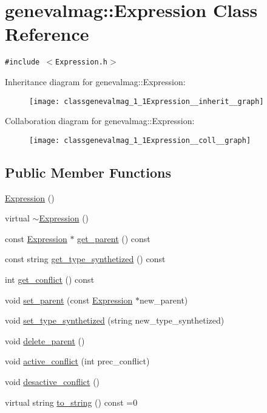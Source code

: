 \hypertarget{classgenevalmag_1_1Expression}{
\section{genevalmag::Expression Class Reference}
\label{classgenevalmag_1_1Expression}
}
{\tt \#include $<$Expression.h$>$}

Inheritance diagram for genevalmag::Expression:\nopagebreak
\begin{figure}[H]
\begin{center}
\leavevmode
\texttt{[image: classgenevalmag\_1\_1Expression\_\_inherit\_\_graph]}
\end{center}
\end{figure}
Collaboration diagram for genevalmag::Expression:\nopagebreak
\begin{figure}[H]
\begin{center}
\leavevmode
\texttt{[image: classgenevalmag\_1\_1Expression\_\_coll\_\_graph]}
\end{center}
\end{figure}
\subsection*{Public Member Functions}
\begin{CompactItemize}
\item 
\hyperlink{classgenevalmag_1_1Expression_249f080918dd3203c7dfc8e9e691bc50}{Expression} ()
\item 
virtual \hyperlink{classgenevalmag_1_1Expression_9ab15992e6a819e8e683745069bcf15b}{$\sim$Expression} ()
\item 
const \hyperlink{classgenevalmag_1_1Expression}{Expression} $\ast$ \hyperlink{classgenevalmag_1_1Expression_21b78e4077b2c9d41076f8c798996f34}{get\_\-parent} () const 
\item 
const string \hyperlink{classgenevalmag_1_1Expression_70ea402fd43f8c588c83196bc4a10183}{get\_\-type\_\-synthetized} () const 
\item 
int \hyperlink{classgenevalmag_1_1Expression_feaeebdfea5e8422299d152f8334034a}{get\_\-conflict} () const 
\item 
void \hyperlink{classgenevalmag_1_1Expression_cba3103fd864eacfefdecb88e597de1f}{set\_\-parent} (const \hyperlink{classgenevalmag_1_1Expression}{Expression} $\ast$new\_\-parent)
\item 
void \hyperlink{classgenevalmag_1_1Expression_22920a0309ce122eb22553898ec0108f}{set\_\-type\_\-synthetized} (string new\_\-type\_\-synthetized)
\item 
void \hyperlink{classgenevalmag_1_1Expression_bfc415a5ddd5ae05b1e9610a2f347203}{delete\_\-parent} ()
\item 
void \hyperlink{classgenevalmag_1_1Expression_6c1265f335e85346c23556cc361c4aad}{active\_\-conflict} (int prec\_\-conflict)
\item 
void \hyperlink{classgenevalmag_1_1Expression_a851daf99e3e04b3cf2bb2c7d53811f8}{desactive\_\-conflict} ()
\item 
virtual string \hyperlink{classgenevalmag_1_1Expression_8685f44429501da942b1fe76880af6fe}{to\_\-string} () const =0
\end{CompactItemize}
